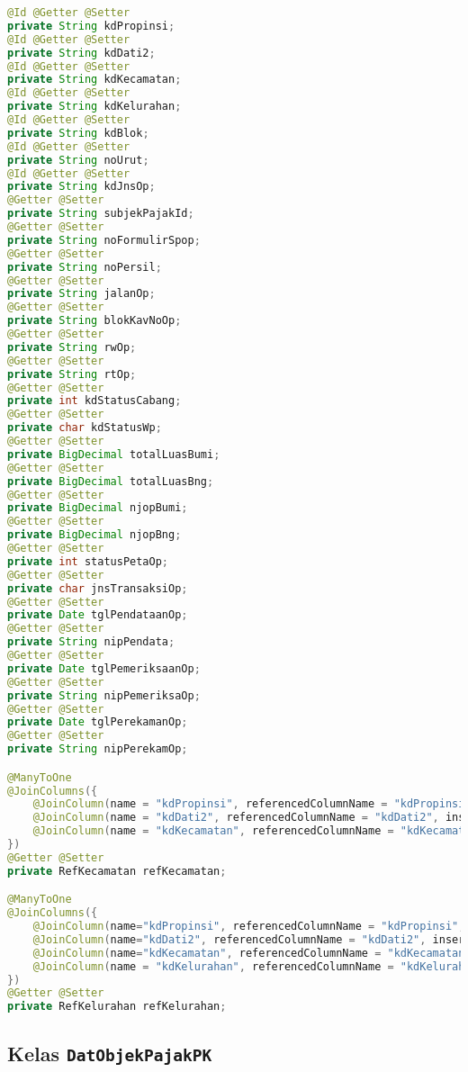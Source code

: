 \documentclass[pdftex,12pt, oneside]{article}
\begin{document}
\begin{lstlisting}[language=java]
@Id @Getter @Setter
private String kdPropinsi;
@Id @Getter @Setter
private String kdDati2;
@Id @Getter @Setter
private String kdKecamatan;
@Id @Getter @Setter
private String kdKelurahan;
@Id @Getter @Setter
private String kdBlok;
@Id @Getter @Setter
private String noUrut;
@Id @Getter @Setter
private String kdJnsOp;
@Getter @Setter
private String subjekPajakId;
@Getter @Setter
private String noFormulirSpop;
@Getter @Setter
private String noPersil;
@Getter @Setter
private String jalanOp;
@Getter @Setter
private String blokKavNoOp;
@Getter @Setter
private String rwOp;
@Getter @Setter
private String rtOp;
@Getter @Setter
private int kdStatusCabang;
@Getter @Setter
private char kdStatusWp;
@Getter @Setter
private BigDecimal totalLuasBumi;
@Getter @Setter
private BigDecimal totalLuasBng;
@Getter @Setter
private BigDecimal njopBumi;
@Getter @Setter
private BigDecimal njopBng;
@Getter @Setter
private int statusPetaOp;
@Getter @Setter
private char jnsTransaksiOp;
@Getter @Setter
private Date tglPendataanOp;
@Getter @Setter
private String nipPendata;
@Getter @Setter
private Date tglPemeriksaanOp;
@Getter @Setter
private String nipPemeriksaOp;
@Getter @Setter
private Date tglPerekamanOp;
@Getter @Setter
private String nipPerekamOp;

@ManyToOne
@JoinColumns({
	@JoinColumn(name = "kdPropinsi", referencedColumnName = "kdPropinsi", insertable = false, updatable = false),
	@JoinColumn(name = "kdDati2", referencedColumnName = "kdDati2", insertable = false, updatable = false),
	@JoinColumn(name = "kdKecamatan", referencedColumnName = "kdKecamatan", insertable = false, updatable = false)
})
@Getter @Setter
private RefKecamatan refKecamatan;

@ManyToOne
@JoinColumns({
	@JoinColumn(name="kdPropinsi", referencedColumnName = "kdPropinsi", insertable = false, updatable = false),
	@JoinColumn(name="kdDati2", referencedColumnName = "kdDati2", insertable = false, updatable = false),
	@JoinColumn(name="kdKecamatan", referencedColumnName = "kdKecamatan", insertable = false, updatable = false),
	@JoinColumn(name = "kdKelurahan", referencedColumnName = "kdKelurahan", insertable = false, updatable = false)
})
@Getter @Setter
private RefKelurahan refKelurahan;
\end{lstlisting}																							

\subsection{Kelas \texttt{DatObjekPajakPK}}
\end{document}
